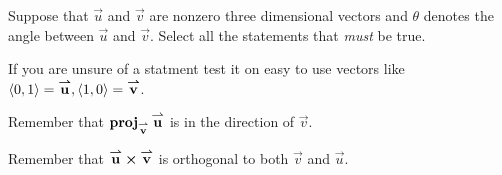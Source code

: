 \documentclass{ximera}
\author{Jim Talamo}
\begin{document}
\begin{exercise}
Suppose that $\vec u $ and $\vec v $ are nonzero three dimensional
vectors and $\theta$ denotes the angle between $\vec u$ and $\vec
v$. Select all the statements that \emph{must} be true.

\begin{selectAll}
\end{selectAll}

\begin{hint}
If you are unsure of a statment test it on easy to use vectors like $\vector{0,1} =\vec u , \vector{1,0} = \vec v$.
\end{hint}

\begin{hint}
Remember that $\proj_{\vec v} \vec u$ is in the direction of $\vec v$.
\end{hint}

\begin{hint}
Remember that $\vec u \cross \vec v$ is orthogonal to both $\vec v$ and $\vec u$.
\end{hint}

\end{exercise}
\end{document}
